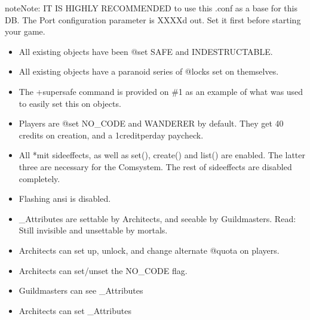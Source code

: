 \documentclass[letterpaper,10pt,english]{sphinxmanual}
\begin{document}
\begin{sphinxadmonition}{note}{Note:}
\sphinxAtStartPar
IT IS HIGHLY RECOMMENDED to use this .conf as a base for this DB.
The \textquotesingle{}Port\textquotesingle{} configuration parameter is XXXX\textquotesingle{}d out. Set it first before starting
your game.
\end{sphinxadmonition}
\begin{itemize}
\item {} 
\sphinxAtStartPar
All existing objects have been @set SAFE and INDESTRUCTABLE.

\item {} 
\sphinxAtStartPar
All existing objects have a paranoid series of @locks set on themselves.

\item {} 
\sphinxAtStartPar
The +supersafe command is provided on \#1 as an example of what was used to
easily set this on objects.

\item {} 
\sphinxAtStartPar
Players are @set NO\_CODE and WANDERER by default. They get 40 credits on
creation, and a 1\sphinxhyphen{}credit\sphinxhyphen{}per\sphinxhyphen{}day paycheck.

\item {} 
\sphinxAtStartPar
All *mit sideeffects, as well as set(), create() and list() are enabled. The
latter three are necessary for the Comsystem. The rest of sideeffects are
disabled completely.

\item {} 
\sphinxAtStartPar
Flashing ansi is disabled.

\item {} 
\sphinxAtStartPar
\_Attributes are settable by Architects, and seeable by Guildmasters. Read:
Still invisible and unsettable by mortals.

\item {} 
\sphinxAtStartPar
Architects can set up, unlock, and change alternate @quota on players.

\item {} 
\sphinxAtStartPar
Architects can set/unset the NO\_CODE flag.

\item {} 
\sphinxAtStartPar
Guildmasters can see \_Attributes

\item {} 
\sphinxAtStartPar
Architects can set \_Attributes

\end{itemize}
\end{document}
